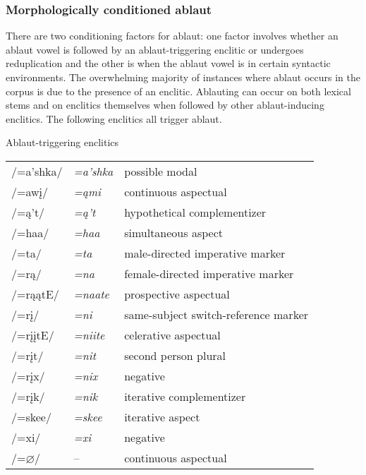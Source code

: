 \subsubsection{Morphologically conditioned ablaut}\label{morphologicallyconditionedablaut}

There are two conditioning factors for ablaut: one factor involves whether an ablaut vowel is followed by an ablaut-triggering enclitic or undergoes reduplication and the other is when the ablaut vowel is in certain syntactic environments. The overwhelming majority of instances where ablaut occurs in the corpus is due to the presence of an enclitic. Ablauting can occur on both lexical stems and on enclitics themselves when followed by other ablaut-inducing enclitics. The following enclitics all trigger ablaut.

\begin{exe}
\item\label{ablautenclitics} Ablaut-triggering enclitics

\begin{tabular}{lll}
/=a'shka/ 	& \textit{=a'shka}	&	possible modal\\
/=awį/		&	\textit{=ąmi}	&	continuous aspectual\\
/=ą't/		&	\textit{=ą't}	&	hypothetical complementizer\\
/=haa/		&	\textit{=haa}	&	simultaneous aspect\\
/=ta/			&	\textit{=ta}		&	male-directed imperative marker\\
/=rą/ 		&	\textit{=na}		&	female-directed imperative marker\\
/=rąątE/	&	\textit{=naate}	&	prospective aspectual\\
/=rį/			&	\textit{=ni}		&	same-subject switch-reference marker\\
/=rįįtE/	&	\textit{=niite}	&	celerative aspectual\\
/=rįt/		&	\textit{=nit}	&	second person plural\\
/=rįx/		&	\textit{=nix}	&	negative\\
/=rįk/		&	\textit{=nik}	&	iterative complementizer\\
/=skee/		&	\textit{=skee}	&	iterative aspect\\
/=xi/			&	\textit{=xi}		&	negative\\
/=$\varnothing$/ & --			&	continuous aspectual\\
\end{tabular}

\end{exe}

